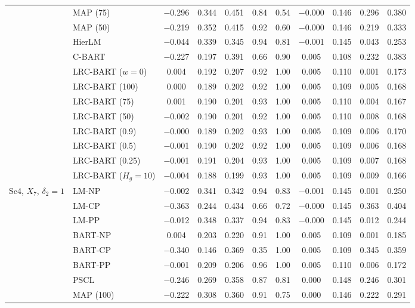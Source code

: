 \documentclass[11pt]{article}
\theoremstyle{definition}
\theoremstyle{plain}
\begin{document}
\begin{center}
\begin{longtable}{llccccccccc}
& MAP (75) & $-$0.296 & 0.344 & 0.451 & 0.84 & 0.54 & $-$0.000 & 0.146 & 0.296 & 0.380 \\
& MAP (50) & $-$0.219 & 0.352 & 0.415 & 0.92 & 0.60 & $-$0.000 & 0.146 & 0.219 & 0.333 \\
& HierLM & $-$0.044 & 0.339 & 0.345 & 0.94 & 0.81 & $-$0.001 & 0.145 & 0.043 & 0.253 \\
& C-BART & $-$0.227 & 0.197 & 0.391 & 0.66 & 0.90 & 0.005 & 0.108 & 0.232 & 0.383 \\
& LRC-BART ($w=0$) & 0.004 & 0.192 & 0.207 & 0.92 & 1.00 & 0.005 & 0.110 & 0.001 & 0.173 \\
& LRC-BART (100) & 0.000 & 0.189 & 0.202 & 0.92 & 1.00 & 0.005 & 0.109 & 0.005 & 0.168 \\
& LRC-BART (75) & 0.001 & 0.190 & 0.201 & 0.93 & 1.00 & 0.005 & 0.110 & 0.004 & 0.167 \\
& LRC-BART (50) & $-$0.002 & 0.190 & 0.201 & 0.92 & 1.00 & 0.005 & 0.110 & 0.008 & 0.168 \\
& LRC-BART (0.9) & $-$0.000 & 0.189 & 0.202 & 0.93 & 1.00 & 0.005 & 0.109 & 0.006 & 0.170 \\
& LRC-BART (0.5) & $-$0.001 & 0.190 & 0.202 & 0.92 & 1.00 & 0.005 & 0.109 & 0.006 & 0.168 \\
& LRC-BART (0.25) & $-$0.001 & 0.191 & 0.204 & 0.93 & 1.00 & 0.005 & 0.109 & 0.007 & 0.168 \\
& LRC-BART ($H_g=10$) & $-$0.004 & 0.188 & 0.199 & 0.93 & 1.00 & 0.005 & 0.109 & 0.009 & 0.166 \\
\midrule
\multirow{20}{*}{Sc4, $X_7$, $\delta_2=1$} & LM-NP & $-$0.002 & 0.341 & 0.342 & 0.94 & 0.83 & $-$0.001 & 0.145 & 0.001 & 0.250 \\
& LM-CP & $-$0.363 & 0.244 & 0.434 & 0.66 & 0.72 & $-$0.000 & 0.145 & 0.363 & 0.404 \\
& LM-PP & $-$0.012 & 0.348 & 0.337 & 0.94 & 0.83 & $-$0.000 & 0.145 & 0.012 & 0.244 \\
& BART-NP & 0.004 & 0.203 & 0.220 & 0.91 & 1.00 & 0.005 & 0.109 & 0.001 & 0.185 \\
& BART-CP & $-$0.340 & 0.146 & 0.369 & 0.35 & 1.00 & 0.005 & 0.109 & 0.345 & 0.359 \\
& BART-PP & $-$0.001 & 0.209 & 0.206 & 0.96 & 1.00 & 0.005 & 0.110 & 0.006 & 0.172 \\
& PSCL & $-$0.246 & 0.269 & 0.358 & 0.87 & 0.81 & 0.000 & 0.148 & 0.246 & 0.301 \\
& MAP (100) & $-$0.222 & 0.308 & 0.360 & 0.91 & 0.75 & 0.000 & 0.146 & 0.222 & 0.291 \\

\end{longtable}
\end{center}
\end{document}
